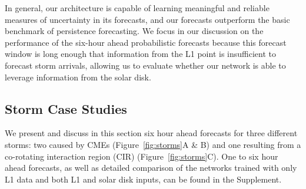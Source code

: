 In general, our architecture is capable of learning meaningful and reliable measures of uncertainty in its forecasts, and our forecasts outperform the basic benchmark of persistence forecasting. We focus in our discussion on the performance of the six-hour ahead probabilistic forecasts because this forecast window is long enough that information from the L1 point is insufficient to forecast storm arrivals, allowing us to evaluate whether our network is able to leverage information from the solar disk.  

\subsection{Storm Case Studies}
We present and discuss in this section six hour ahead forecasts for three different storms: two caused by CMEs (Figure~\ref{fig:storms}A \& B) and one resulting from a co-rotating interaction region (CIR) (Figure~\ref{fig:storms}C). One to six hour ahead forecasts, as well as detailed comparison of the networks trained with only L1 data and both L1 and solar disk inputs, can be found in the Supplement.

